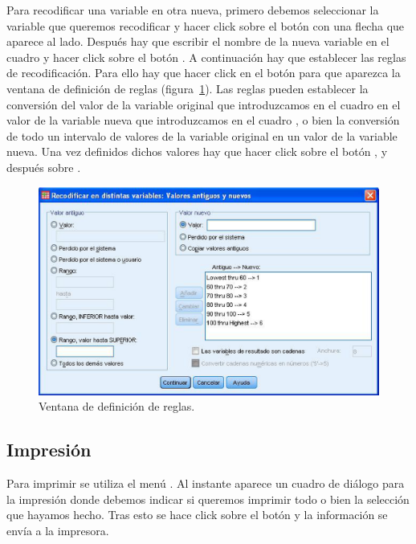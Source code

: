 Para recodificar una variable en otra nueva, primero debemos seleccionar la variable que queremos recodificar y hacer click sobre el botón con una flecha que aparece al lado. Después hay que escribir el nombre de la nueva variable en el cuadro  y hacer click sobre el botón . A continuación hay que establecer las reglas de recodificación. Para ello hay que hacer click en el botón  para que aparezca la ventana de definición de reglas (figura~\ref{g:definicion_intervalos}). Las reglas pueden establecer la conversión del valor de la variable original que introduzcamos en el cuadro  en el valor de la variable nueva que introduzcamos en el cuadro , o bien la conversión de todo un intervalo de valores de la variable original en un valor de la variable nueva. Una vez definidos dichos valores hay que hacer click sobre el botón , y después sobre .

\begin{figure}[h!]
\begin{center}
\includegraphics[scale=0.6]{introduccion_spss/img/definicion_intervalos}
\caption{Ventana de definición de reglas.}
\label{g:definicion_intervalos}
\end{center}
\end{figure}

\subsection{Impresión}
Para imprimir se utiliza el menú . Al instante aparece un cuadro de diálogo para la impresión donde debemos indicar si queremos imprimir todo o bien la selección que hayamos hecho. Tras esto se hace click sobre el botón  y la información se envía a la impresora.

